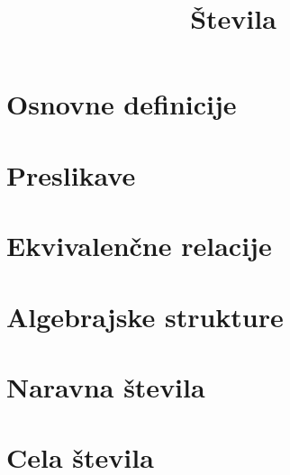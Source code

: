 \documentclass[11pt]{article}
\title{Števila}
\begin{document}
    \maketitle
    \pagebreak

    \section{Osnovne definicije}
    
    \pagebreak

    \section{Preslikave}
    
    \pagebreak

    \section{Ekvivalenčne relacije}
    
    \pagebreak

    \section{Algebrajske strukture}
    
    \pagebreak

    \section{Naravna števila}
    
    \pagebreak

    \section{Cela števila}
    
    \pagebreak
\end{document}
